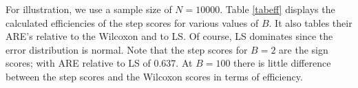 %


For illustration, we use a sample size of $N=10000$. 
Table \ref{tabeff} displays the calculated efficiencies of the step scores for various values of $B$.
It also tables their ARE's relative to the Wilcoxon and to LS.
Of course, LS dominates since the error distribution is normal.
Note that the step scores for $B=2$ are the sign scores; with ARE relative to LS of 
0.637.
At $B=100$ there is little difference between the step scores and the Wilcoxon scores in terms
of efficiency. 

